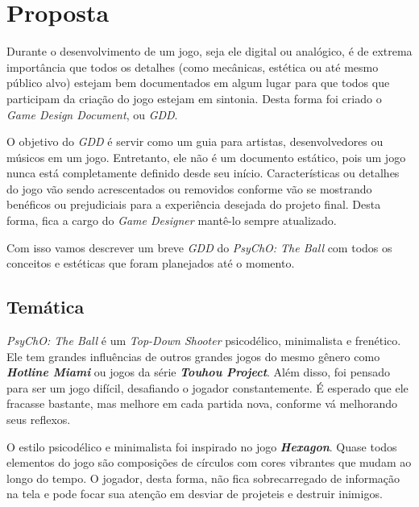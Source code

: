 
\chapter{Proposta}
\label{cap:proposta}

Durante o desenvolvimento de um jogo, seja ele digital ou analógico, é de extrema importância
que todos os detalhes (como mecânicas, estética ou até mesmo público alvo) estejam bem documentados
em algum lugar para que todos que participam da criação do jogo estejam em sintonia. Desta forma
foi criado o \textit{Game Design Document}, ou \textit{GDD}.

O objetivo do \textit{GDD} é servir como um guia para artistas, desenvolvedores ou músicos em um
jogo. Entretanto, ele não é um documento estático, pois um jogo nunca está completamente definido desde seu
início. Características ou detalhes do jogo vão sendo acrescentados ou removidos conforme vão se mostrando
benéficos ou prejudiciais para a experiência desejada do projeto final. Desta forma, fica a cargo do \textit{Game Designer} mantê-lo sempre atualizado.

Com isso vamos descrever um breve \textit{GDD} do \textit{PsyChO: The Ball} com todos os conceitos e
estéticas que foram planejados até o momento.

\section{Temática}
\label{sec:tematica}

\textit{PsyChO: The Ball} é um \textit{Top-Down Shooter} psicodélico, minimalista e frenético. Ele tem grandes influências de outros grandes jogos do mesmo gênero como \textbf{\textit{Hotline Miami}}\cite{hotline} ou jogos da série \textbf{\textit{Touhou Project}}\cite{touhou}. Além disso, foi pensado para ser um jogo difícil, desafiando o jogador constantemente. É esperado que ele fracasse bastante, mas melhore em cada partida nova, conforme vá melhorando seus reflexos.

O estilo psicodélico e minimalista foi inspirado no jogo \textbf{\textit{Hexagon}}\cite{hexagon}. Quase
todos elementos do jogo são composições de círculos com cores vibrantes que mudam ao longo do tempo. O jogador, desta forma, não fica sobrecarregado de informação na tela e pode focar sua atenção em desviar de projeteis e destruir inimigos.

